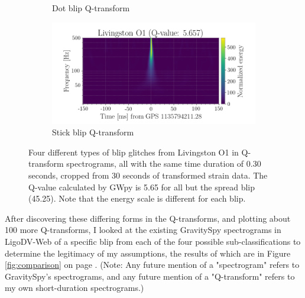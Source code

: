\documentclass[a4paper]{article}
\begin{document}
\begin{figure}[h!]
\begin{subfigure}{.49\textwidth}
		\caption{Dot blip Q-transform}
		\label{fig:dot}
	\end{subfigure}
	\begin{subfigure}{.49\textwidth}
		\centering
		\includegraphics[width=1\linewidth]{stick_blip}
		\caption{Stick blip Q-transform}
		\label{fig:stick}
	\end{subfigure}
	\caption{Four different types of blip glitches from Livingston O1 in Q-transform spectrograms, all with the same time duration of 0.30 seconds, cropped from 30 seconds of transformed strain data. The Q-value calculated by GWpy is 5.65 for all but the spread blip (45.25). Note that the energy scale is different for each blip.}
	\label{fig:q_transforms}
\end{figure}

After discovering these differing forms in the Q-transforms, and plotting about 100 more Q-transforms, I looked at the existing GravitySpy spectrograms in LigoDV-Web of a specific blip from each of the four possible sub-classifications to determine the legitimacy of my assumptions, the results of which are in Figure \ref{fig:comparison} on page \pageref{fig:comparison}. (Note: Any future mention of a "spectrogram" refers to GravitySpy's spectrograms, and any future mention of a "Q-transform" refers to my own short-duration spectrograms.)
\end{document}
